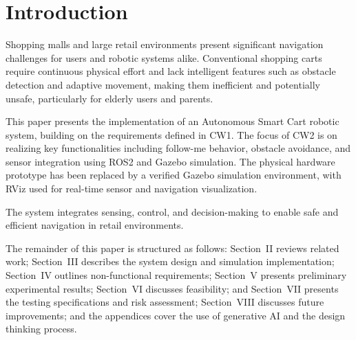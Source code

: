 \section{Introduction}

Shopping malls and large retail environments present significant
navigation challenges for users and robotic systems alike.
Conventional shopping carts require continuous physical effort and
lack intelligent features such as obstacle detection and adaptive
movement, making them inefficient and potentially unsafe,
particularly for elderly users and parents.

This paper presents the implementation of an Autonomous Smart Cart
robotic system, building on the requirements defined in CW1.
The focus of CW2 is on realizing key functionalities including
follow-me behavior, obstacle avoidance, and sensor integration
using ROS2 and Gazebo simulation. The physical hardware prototype
has been replaced by a verified Gazebo simulation environment,
with RViz used for real-time sensor and navigation visualization.

The system integrates sensing, control, and decision-making to enable safe and efficient navigation in retail environments.

The remainder of this paper is structured as follows:
Section~II reviews related work; Section~III describes the system
design and simulation implementation; Section~IV outlines
non-functional requirements; Section~V presents preliminary
experimental results; Section~VI discusses feasibility; and
Section~VII presents the testing specifications and risk assessment;
Section~VIII discusses future improvements; and the appendices cover
the use of generative AI and the design thinking process.
